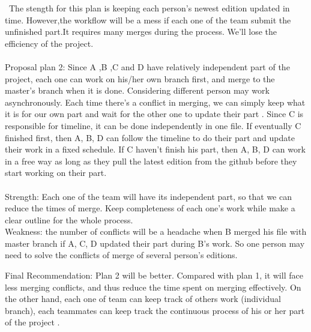 \documentclass[12pt]{article}
\begin{document}
\ The stength for this plan is keeping each person's newest edition updated in time. However,the workflow will be a mess if each one of the team submit the unfinished part.It requires many merges during the process. We'll lose the efficiency of the project.\\
\\Proposal plan 2: Since A ,B ,C and D have relatively independent part of the project, each one can work on his/her own branch first, and merge to the master's branch when it is done. Considering different person may work asynchronously. Each time there's a conflict in merging, we can simply keep what it is for our own part and wait for the other one to update their part . Since C is responsible for timeline, it can be done independently in one file. If eventually C finished first, then A, B, D can follow the timeline to do their part and update their work in a fixed schedule. If C haven't finish his part, then A, B, D can work in a free way as long as they pull the latest edition from the github before they start working on their part. \\
\\Strength: Each one of the team will have its independent part, so that we can reduce the times of merge. Keep completeness of each one's work while make a clear outline for the whole process. 
\\Weakness: the number of conflicts will be a headache when B merged his file with master branch if  A, C, D  updated their part during B's work. So one person may need to solve the conflicts of merge of several person's editions. 


Final Recommendation: Plan 2 will be better.  Compared with plan 1, it will face less merging conflicts, and thus reduce the time spent on merging effectively. On the other hand, each one of team can keep track of others work (individual branch), each teammates can keep track the continuous process of his or her part of the project .
\end{document}
